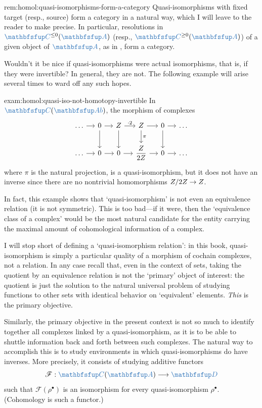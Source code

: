 \begin{rem}{}{rem:homol:quasi-isomorphisms-form-a-category}
  Quasi-isomorphisms with fixed target (resp., source) form a category
  in a natural way, which I will leave to the reader to make
  precise. In particular, resolutions in
  $\categ{C}^{\leq 0}(\categ{A})$ (resp.,
  $\categ{C}^{\geq 0}(\categ{A})$) of a given object of $\categ{A}$,
  as in , form a category.
\end{rem}

Wouldn't it be nice if quasi-isomorphisms were actual isomorphisms,
that is, if they were invertible? In general, they are not. The
following example will arise several times to ward off any such hopes.

\begin{exam}{}{exam:homol:quasi-iso-not-homotopy-invertible}
  In $\categ{C}(\categ{Ab})$, the morphism of complexes
  \[\begin{tikzcd}[column sep=small]
      \dots \arrow[r] & 0 \arrow[r] \arrow[d] & \Z \arrow[r, "\cdot
      2"] \arrow[d] &
      \Z \arrow[r] \arrow[d, "\pi"] & 0 \arrow[r] \arrow[d] & \dots \\
      \dots \arrow[r] & 0 \arrow[r] & 0 \arrow[r] & \dfrac{\Z}{2\Z}
      \arrow[r] & 0 \arrow[r] & \dots
    \end{tikzcd}\] where $\pi$ is the natural projection, is a
  quasi-isomorphism, but it does not have an inverse since there are
  no nontrivial homomorphisms $Z/2Z \to Z$.
\end{exam}

In fact, this example shows that `quasi-isomorphism' is not even an
equivalence relation (it is not symmetric). This is too bad---if it
were, then the `equivalence class of a complex' would be the most
natural candidate for the entity carrying the maximal amount of
cohomological information of a complex.

I will stop short of defining a `quasi-isomorphism relation': in this
book, quasi-isomorphism is simply a particular quality of a morphism
of cochain complexes, not a relation. In any case recall that, even in
the context of sets, taking the quotient by an equivalence relation is
not the `primary' object of interest: the quotient is just the
solution to the natural universal problem of studying functions to
other sets with identical behavior on `equivalent'
elements. \emph{This} is the primary objective.

Similarly, the primary objective in the present context is not so much
to identify together all complexes linked by a quasi-isomorphism, as
it is to be able to shuttle information back and forth between such
complexes. The natural way to accomplish this is to study environments
in which quasi-isomorphisms do have inverses. More precisely, it
consists of studying additive functors
\[
  \mathscr{F} : \categ{C}(\categ{A}) \longrightarrow \categ{D}
\]
such that $\mathscr{F}(\rho^\bullet)$ is an isomorphism for every
quasi-isomorphism $\rho^\bullet$. (Cohomology is such a functor.)


